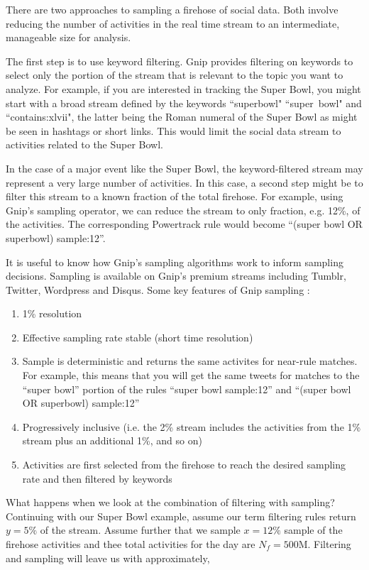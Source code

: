 \documentclass{article}
\begin{document}
There are two approaches to sampling a firehose of social data. Both involve reducing the number of activities in the real time stream to an
intermediate, manageable size for analysis.

The first step is to use keyword filtering.  Gnip provides filtering on keywords to select only the portion of the stream that is relevant to the topic you want to analyze. For example, if you are interested in tracking the Super Bowl, you might start with a broad stream defined by the keywords ``superbowl" ``super~bowl" and ``contains:xlvii", the latter being the Roman numeral of the Super Bowl as might be seen in hashtags or short links. This would limit the social data stream to activities related to the Super Bowl.

In the case of a major event like the Super Bowl, the keyword-filtered stream may represent a very large number of activities.  In this case, a second step might be to filter this stream to a known fraction of the total firehose. For example, using Gnip's sampling operator, we can reduce the stream to only fraction, e.g. 12\%, of the activities. The corresponding Powertrack rule would become  ``(super bowl OR superbowl) sample:12''.

It is useful to know how Gnip's sampling algorithms work to inform sampling decisions.  Sampling is available on Gnip's premium streams including Tumblr, Twitter, Wordpress and Disqus. Some key features of Gnip sampling :

\begin{enumerate}
	\item 1\% resolution
	\item Effective sampling rate stable (short time resolution)
	\item Sample is deterministic and returns the same activites for near-rule matches.  For example, this means that you will get the same tweets for matches to the ``super bowl'' portion of the rules ``super bowl sample:12'' and ``(super bowl OR superbowl) sample:12''
	\item Progressively inclusive (i.e. the 2\% stream includes the activities from the 1\% stream plus an additional 1\%,  and so on)
	\item Activities are first selected from the firehose to reach the desired sampling rate and then filtered by keywords 
\end{enumerate}

What happens when we look at the combination of filtering with sampling?  Continuing with our Super Bowl example, assume our term filtering rules return $y=5\%$ of the stream. Assume further that we sample $x=12\%$ sample of the firehose activities and thee total activities for the day are $N_f=500$M.
Filtering and sampling will leave us with approximately,
\end{document}
